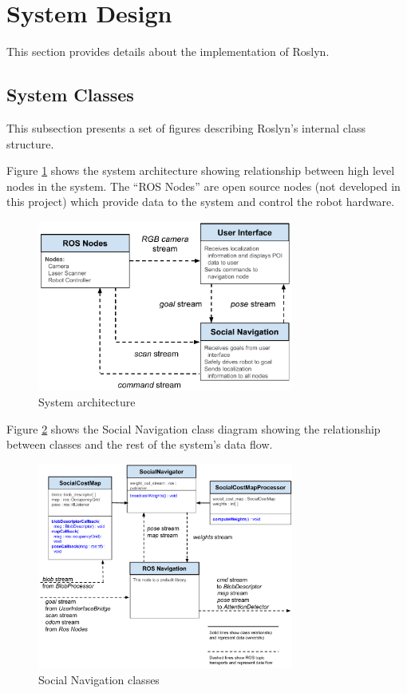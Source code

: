 \documentclass[11pt]{report}
\begin{document}
\section{System Design}
This section provides details about the implementation of Roslyn.

\subsection{System Classes}
This subsection presents a set of figures describing Roslyn's internal class structure.

Figure \ref{fig:system_class_overview} shows the system architecture showing relationship between high level nodes in the system. The “ROS Nodes” are open source nodes (not developed in this project) which provide data to the system and control the robot hardware.
\begin{figure}[H]
 \centering
 \includegraphics[width=0.75\textwidth]{system_class_overview.pdf}
 \caption{System architecture}
 \label{fig:system_class_overview}
\end{figure}

Figure \ref{fig:social_navigation} shows the Social Navigation class diagram showing the relationship between classes and the rest of the system’s data flow.
\begin{figure}[H]
 \centering
 \includegraphics[width=0.75\textwidth]{social_navigation.pdf}
 \caption{Social Navigation classes}
 \label{fig:social_navigation}
\end{figure}
\end{document}
